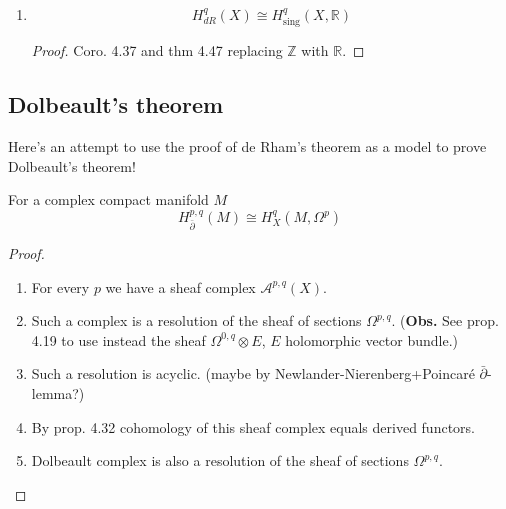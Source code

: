 \documentclass{article}
\numberwithin{equation}{section}
\newcommand{\R}{\mathbb{R}}
\newcommand{\Z}{\mathbb{Z}}
\newcommand{\Ac}{\mathcal{A}}
\newcommand{\Cc}{\mathcal{C}}
\DeclareMathOperator{\sing}{sing}
\begin{document}
\begin{enumerate}
\begin{proof}
\begin{enumerate}
				\item Such a resolution is acyclic for $\Gamma$. (prop 4.34; it is flasque)
				
				\item By prop. 4.32 cohomology of acyclic resolution equals derived functors. {\color{blue-violet}Constant sheaf $\Z$ is also acyclic resolution?}
				\[H^q(X,\Z)=H^q(\Gamma(\Cc_{\sing}^\bullet))\]
				
				\item $\Gamma(\Cc^\bullet_{\sing})$ is quasi-isomorphic to $C^\bullet_{\sing}$.
			\end{enumerate}
		\end{proof}\clearpage
		\item \begin{coro}
			\[H_{dR}^q(X)\cong H_{\sing}^q(X,\R)\]
		\end{coro}
		\begin{proof}
			Coro. 4.37 and thm 4.47 replacing $\Z$ with $\R$.
		\end{proof}
		
	\end{enumerate}
	
	\subsection*{Dolbeault's theorem}
	Here's an attempt to use the proof of de Rham's theorem as a model to prove Dolbeault's theorem! 
	\begin{thm}
		For a complex compact manifold $M$
		\[H^{p,q}_{\bar\partial}(M)\cong H^q_X(M,\Omega^p)\]
	\end{thm}
	\begin{proof}\leavevmode
		\begin{enumerate}
			\item For every $p$ we have a sheaf complex $\Ac^{p,q}(X)$.
			\item Such a complex is a resolution of the sheaf of sections $\Omega^{p,q}$. (\textbf{Obs.} See prop. 4.19 \cite{voisin}  to use instead the sheaf $\Omega^{0,q}\otimes E$, $E$ holomorphic vector bundle.)
			\item Such a resolution is acyclic. ({\color{blue-violet}maybe by Newlander-Nierenberg+Poincar\'e $\bar\partial$-lemma?)}
			\item By \cite{voisin} prop. 4.32 cohomology of this sheaf complex equals derived functors.
			\item {\color{blue-violet}Dolbeault complex is also a resolution of the sheaf of sections $\Omega^{p,q}$.}
		\end{enumerate}
	\end{proof}
	
\end{document}
